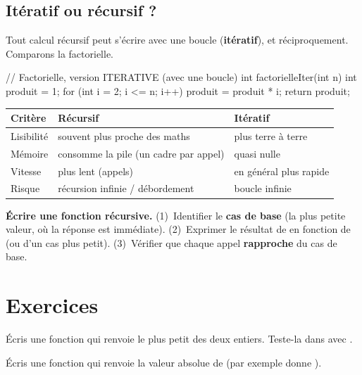 \subsection{Itératif ou récursif ?}

Tout calcul récursif peut s'écrire avec une boucle (\textbf{itératif}), et
réciproquement. Comparons la factorielle.

\begin{codec}
// Factorielle, version ITERATIVE (avec une boucle)
int factorielleIter(int n) {
    int produit = 1;
    for (int i = 2; i <= n; i++) {
        produit = produit * i;
    }
    return produit;
}
\end{codec}

\begin{center}\small
\begin{tabular}{@{}lll@{}}
\toprule
\textbf{Critère} & \textbf{Récursif} & \textbf{Itératif}\\
\midrule
Lisibilité & souvent plus proche des maths & plus terre à terre\\
Mémoire & consomme la pile (un cadre par appel) & quasi nulle\\
Vitesse & plus lent (appels) & en général plus rapide\\
Risque & récursion infinie / débordement & boucle infinie\\
\bottomrule
\end{tabular}
\end{center}

\begin{methode}
\textbf{Écrire une fonction récursive.} (1)~Identifier le \textbf{cas de base}
(la plus petite valeur, où la réponse est immédiate). (2)~Exprimer le résultat de
 en fonction de  (ou d'un cas plus petit). (3)~Vérifier
que chaque appel \textbf{rapproche} du cas de base.
\end{methode}

\section{Exercices}


Écris une fonction  qui renvoie le plus petit des deux
entiers. Teste-la dans  avec .

Écris une fonction  qui renvoie la valeur absolue de
 (par exemple  donne ).

